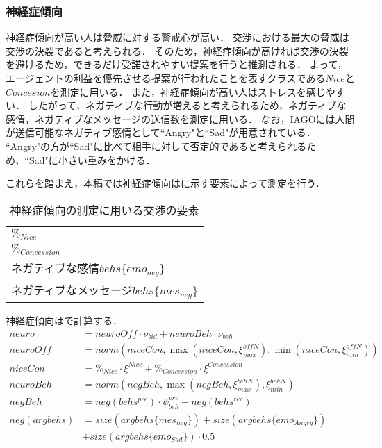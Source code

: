 \subsubsection{神経症傾向}
神経症傾向が高い人は脅威に対する警戒心が高い．
交渉における最大の脅威は交渉の決裂であると考えられる．
そのため，神経症傾向が高ければ交渉の決裂を避けるため，できるだけ受諾されやすい提案を行うと推測される．
よって，エージェントの利益を優先させる提案が行われたことを表すクラスである$Nice$と$Concesion$を測定に用いる．
また，神経症傾向が高い人はストレスを感じやすい．
したがって，ネガティブな行動が増えると考えられるため，ネガティブな感情，ネガティブなメッセージの送信数を測定に用いる．
なお，IAGOには人間が送信可能なネガティブ感情として“Angry"と“Sad"が用意されている．
“Angry"の方が“Sad"に比べて相手に対して否定的であると考えられるため，“Sad"に小さい重みをかける．

これらを踏まえ，本稿では神経症傾向はに示す要素によって測定を行う．

\begin{table}[tb]
    \centering
    \caption{神経症傾向の測定に用いる交渉の要素}
    \begin{tabular}{l} \toprule
        $\%_{Nice}$ \\
        $\%_{Concession}$ \\
        ネガティブな感情$behs\{emo_{neg}\}$ \\
        ネガティブなメッセージ$behs\{mes_{neg}\}$ \\ \bottomrule
    \end{tabular}
    \label{tab:neuroticism}
\end{table}

神経症傾向はで計算する．
\begin{align}
    neuro &= \mathit{neuroOff} \cdot \nu_{\mathit{bid}} + neuroBeh \cdot \nu_{beh} \label{eq:neuroticism} \\
    \mathit{neuroOff} &= norm\left(niceCon, \max \left( niceCon, \xi_{max}^{\mathit{offN}}\right) , \min \left(niceCon, \xi_{min}^{\mathit{offN}}\right) \right) \nonumber \\
    niceCon &= \%_{Nice} \cdot \xi^{\mathit{Nice}} + \%_{Concession} \cdot \xi^{\mathit{Concession}} \nonumber \\
    neuroBeh &= norm\left( negBeh, \max \left( negBeh, \xi_{max}^{\mathit{behN}}\right), \xi_{min}^{\mathit{behN}} \right) \nonumber \\
    negBeh &=  neg(behs^{pre}) \cdot \psi_{beh}^{pre} + neg(behs^{rec}) \nonumber \\
    neg(argbehs) &= size(argbehs\{mes_{neg}\}) + size(argbehs\{emo_{Angry}\}) \nonumber \\
    &+ size(argbehs\{emo_{Sad}\}) \cdot 0.5 \nonumber 
\end{align}

